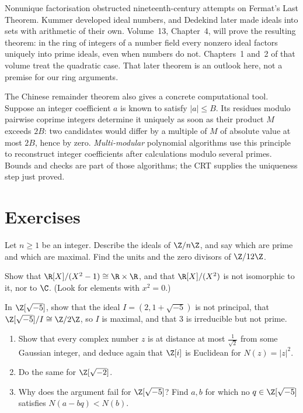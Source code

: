 \begin{beauty}
Nonunique factorisation obstructed nineteenth-century attempts on Fermat's Last Theorem. Kummer developed ideal numbers, and Dedekind later made ideals into sets with arithmetic of their own. Volume~13, Chapter~4, will prove the resulting theorem: in the ring of integers of a number field every nonzero ideal factors uniquely into prime ideals, even when numbers do not. Chapters~1 and~2 of that volume treat the quadratic case. That later theorem is an outlook here, not a premise for our ring arguments.

The Chinese remainder theorem also gives a concrete computational tool.
Suppose an integer coefficient $a$ is known to satisfy $|a|\le B$.
Its residues modulo pairwise coprime integers determine it uniquely as
soon as their product $M$ exceeds $2B$: two candidates would differ by
a multiple of $M$ of absolute value at most $2B$, hence by zero.
\emph{Multi-modular} polynomial algorithms use this principle to
reconstruct integer coefficients after calculations modulo several
primes. Bounds and checks are part of those algorithms; the CRT supplies
the uniqueness step just proved.
\end{beauty}

\section{Exercises}

\begin{exercise}[$\star$]\label{ex:idealsZn}
Let $n\ge1$ be an integer. Describe the ideals of $\Z/n\Z$, and say which are prime and which are maximal. Find the units and the zero divisors of $\Z/12\Z$.
\end{exercise}

\begin{exercise}[$\star$]\label{ex:quot}
Show that $\R[X]/(X^2-1)\cong\R\times\R$, and that $\R[X]/(X^2)$ is not isomorphic to it, nor to $\C$. (Look for elements with $x^2=0$.)
\end{exercise}

\begin{exercise}[$\star\star$]\label{ex:zsqrtm5}
In $\Z[\sqrt{-5}]$, show that the ideal $I=(2,1+\sqrt{-5})$ is not principal, that $\Z[\sqrt{-5}]/I\cong\Z/2\Z$, so $I$ is maximal, and that $3$ is irreducible but not prime.
\end{exercise}

\begin{exercise}[$\star\star$]\label{ex:zi}
\begin{enumerate}[label=(\alph*)]
\item Show that every complex number $z$ is at distance at most $\frac1{\sqrt2}$ from some Gaussian integer, and deduce again that $\Z[i]$ is Euclidean for $N(z)=|z|^2$.
\item Do the same for $\Z[\sqrt{-2}]$.
\item Why does the argument fail for $\Z[\sqrt{-5}]$? Find $a,b$ for which no $q\in\Z[\sqrt{-5}]$ satisfies $N(a-bq)<N(b)$.
\end{enumerate}
\end{exercise}

